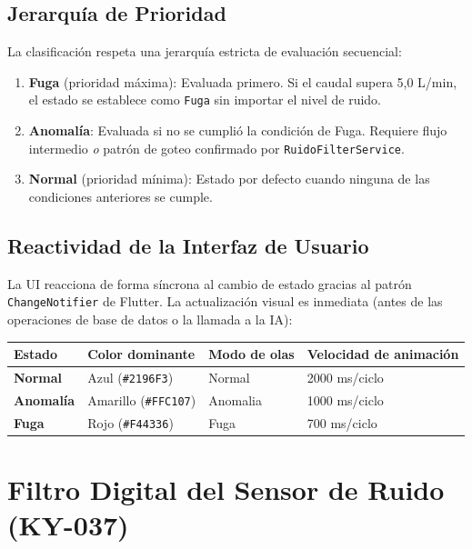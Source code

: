 \documentclass[12pt,a4paper]{article}
\begin{document}
\subsection{Jerarquía de Prioridad}

La clasificación respeta una jerarquía estricta de evaluación secuencial:

\begin{enumerate}[noitemsep]
    \item \textbf{Fuga} (prioridad máxima): Evaluada primero. Si el caudal supera 5,0 L/min, el estado se establece como \texttt{Fuga} sin importar el nivel de ruido.
    \item \textbf{Anomalía}: Evaluada si no se cumplió la condición de Fuga. Requiere flujo intermedio \textit{o} patrón de goteo confirmado por \texttt{RuidoFilterService}.
    \item \textbf{Normal} (prioridad mínima): Estado por defecto cuando ninguna de las condiciones anteriores se cumple.
\end{enumerate}

\subsection{Reactividad de la Interfaz de Usuario}

La UI reacciona de forma síncrona al cambio de estado gracias al patrón \texttt{ChangeNotifier} de Flutter. La actualización visual es inmediata (antes de las operaciones de base de datos o la llamada a la IA):

\begin{center}
\begin{tabularx}{0.88\textwidth}{>{\bfseries}lXXX}
    \toprule
    \textbf{Estado} & \textbf{Color dominante} & \textbf{Modo de olas} & \textbf{Velocidad de animación} \\
    \midrule
    Normal   & Azul (\texttt{\#2196F3}) & Normal  & 2000 ms/ciclo \\
    Anomalía & Amarillo (\texttt{\#FFC107}) & Anomalia & 1000 ms/ciclo \\
    Fuga     & Rojo (\texttt{\#F44336})  & Fuga    & 700 ms/ciclo \\
    \bottomrule
\end{tabularx}
\end{center}

\section{Filtro Digital del Sensor de Ruido (KY-037)}
\end{document}
